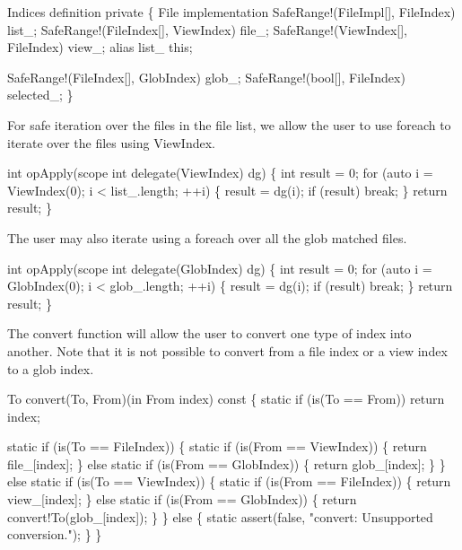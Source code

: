 \nwenddocs{}\endmoddef\nwstartdeflinemarkup\nwenddeflinemarkup
\LA{}Indices definition\RA{}
private \{
  \LA{}File implementation\RA{}
  SafeRange!(FileImpl[],  FileIndex) list_;
  SafeRange!(FileIndex[], ViewIndex) file_;
  SafeRange!(ViewIndex[], FileIndex) view_;
  alias list_ this;

  SafeRange!(FileIndex[], GlobIndex) glob_;
  SafeRange!(bool[], FileIndex)      selected_;
\}

\nwendcode{}For safe iteration over the files in the file list, we allow the
user to use {\Tt{}foreach\nwendquote} to iterate over the files using {\Tt{}ViewIndex\nwendquote}.

\nwenddocs{}\endmoddef\nwstartdeflinemarkup\nwenddeflinemarkup
int opApply(scope int delegate(ViewIndex) dg) \{
  int result = 0;
  for (auto i = ViewIndex(0);
            i < list_.length;
            ++i) \{
    result = dg(i);
    if (result) break;
  \}
  return result;
\}

\nwendcode{}The user may also iterate using a {\Tt{}foreach\nwendquote} over all the glob
matched files.

\nwenddocs{}\plusendmoddef\nwstartdeflinemarkup\nwenddeflinemarkup
int opApply(scope int delegate(GlobIndex) dg) \{
  int result = 0;
  for (auto i = GlobIndex(0);
            i < glob_.length;
            ++i) \{
    result = dg(i);
    if (result) break;
  \}
  return result;
\}

\nwendcode{}The {\Tt{}convert\nwendquote} function will allow the user to convert one type of
index into another. Note that it is not possible to convert from a
file index or a view index to a glob index.

\nwenddocs{}\plusendmoddef\nwstartdeflinemarkup\nwenddeflinemarkup
To convert(To, From)(in From index) const \{
  static if (is(To == From)) return index;
  
  static if (is(To == FileIndex)) \{
    static if (is(From == ViewIndex)) \{
      return file_[index];
    \} else static if (is(From == GlobIndex)) \{
      return glob_[index];
    \}
  \} else static if (is(To == ViewIndex)) \{
    static if (is(From == FileIndex)) \{
      return view_[index];
    \} else static if (is(From == GlobIndex)) \{
      return convert!To(glob_[index]);
    \}
  \} else \{
    static assert(false, "convert: Unsupported conversion.");
  \}
\}

